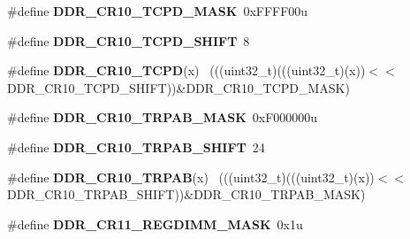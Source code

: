 \begin{DoxyCompactItemize}
\item 
\hypertarget{group___d_d_r___register___masks_ga2a26c969a4a5e88f0351e6e661cee93c}{}\#define {\bfseries D\+D\+R\+\_\+\+C\+R10\+\_\+\+T\+C\+P\+D\+\_\+\+M\+A\+S\+K}~0x\+F\+F\+F\+F00u\label{group___d_d_r___register___masks_ga2a26c969a4a5e88f0351e6e661cee93c}

\item 
\hypertarget{group___d_d_r___register___masks_gac0f71b7e472ea311e5ece52d9f6fb453}{}\#define {\bfseries D\+D\+R\+\_\+\+C\+R10\+\_\+\+T\+C\+P\+D\+\_\+\+S\+H\+I\+F\+T}~8\label{group___d_d_r___register___masks_gac0f71b7e472ea311e5ece52d9f6fb453}

\item 
\hypertarget{group___d_d_r___register___masks_gad473a3d771a2c371a259c05ebb2471a1}{}\#define {\bfseries D\+D\+R\+\_\+\+C\+R10\+\_\+\+T\+C\+P\+D}(x)                                              ~(((uint32\+\_\+t)(((uint32\+\_\+t)(x))$<$$<$D\+D\+R\+\_\+\+C\+R10\+\_\+\+T\+C\+P\+D\+\_\+\+S\+H\+I\+F\+T))\&D\+D\+R\+\_\+\+C\+R10\+\_\+\+T\+C\+P\+D\+\_\+\+M\+A\+S\+K)\label{group___d_d_r___register___masks_gad473a3d771a2c371a259c05ebb2471a1}

\item 
\hypertarget{group___d_d_r___register___masks_ga3003388b6dfca3121f66b2c6de573f3c}{}\#define {\bfseries D\+D\+R\+\_\+\+C\+R10\+\_\+\+T\+R\+P\+A\+B\+\_\+\+M\+A\+S\+K}~0x\+F000000u\label{group___d_d_r___register___masks_ga3003388b6dfca3121f66b2c6de573f3c}

\item 
\hypertarget{group___d_d_r___register___masks_ga5d3cf72d46340ca2a447efbad0e87594}{}\#define {\bfseries D\+D\+R\+\_\+\+C\+R10\+\_\+\+T\+R\+P\+A\+B\+\_\+\+S\+H\+I\+F\+T}~24\label{group___d_d_r___register___masks_ga5d3cf72d46340ca2a447efbad0e87594}

\item 
\hypertarget{group___d_d_r___register___masks_ga3f747d8f6f6c8fb8c95f3e02c9f8457d}{}\#define {\bfseries D\+D\+R\+\_\+\+C\+R10\+\_\+\+T\+R\+P\+A\+B}(x)                                            ~(((uint32\+\_\+t)(((uint32\+\_\+t)(x))$<$$<$D\+D\+R\+\_\+\+C\+R10\+\_\+\+T\+R\+P\+A\+B\+\_\+\+S\+H\+I\+F\+T))\&D\+D\+R\+\_\+\+C\+R10\+\_\+\+T\+R\+P\+A\+B\+\_\+\+M\+A\+S\+K)\label{group___d_d_r___register___masks_ga3f747d8f6f6c8fb8c95f3e02c9f8457d}

\item 
\hypertarget{group___d_d_r___register___masks_ga3fe8a030a9fcb4c151ee59497d2abba4}{}\#define {\bfseries D\+D\+R\+\_\+\+C\+R11\+\_\+\+R\+E\+G\+D\+I\+M\+M\+\_\+\+M\+A\+S\+K}~0x1u\label{group___d_d_r___register___masks_ga3fe8a030a9fcb4c151ee59497d2abba4}


\end{DoxyCompactItemize}
